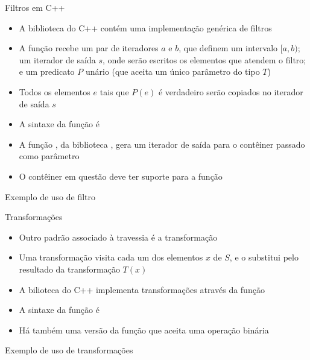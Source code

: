 \begin{frame}[fragile]{Filtros em C++}

    \begin{itemize}
        \item A biblioteca  do C++ contém uma implementação genérica de
            filtros

        \item A função  recebe um par de iteradores $a$ e $b$, que 
            definem um intervalo $[a, b)$; um iterador de saída $s$, onde serão escritos
            os elementos que atendem o filtro; e um predicato $P$ unário (que aceita um único
            parâmetro do tipo $T$)

        \item Todos os elementos $e$ tais que $P(e)$ é verdadeiro serão copiados no iterador de
            saída $s$

        \item A sintaxe da função  é 

        \item A função , da biblioteca , gera
            um iterador de saída para o contêiner passado como parâmetro

        \item O contêiner em questão deve ter suporte para a função 

    \end{itemize}

\end{frame}

\begin{frame}[fragile]{Exemplo de uso de filtro}
\end{frame}

\begin{frame}[fragile]{Transformações}

    \begin{itemize}
        \item Outro padrão associado à travessia é a transformação

        \item Uma transformação visita cada um dos elementos $x$ de $S$, e o substitui pelo 
            resultado da transformação $T(x)$

        \item A bilioteca  do C++ implementa transformações através da
            função 

        \item A sintaxe da função  é

        \item Há também uma versão da função  que aceita uma operação
            binária
    \end{itemize}

\end{frame}

\begin{frame}[fragile]{Exemplo de uso de transformações}
\end{frame}

